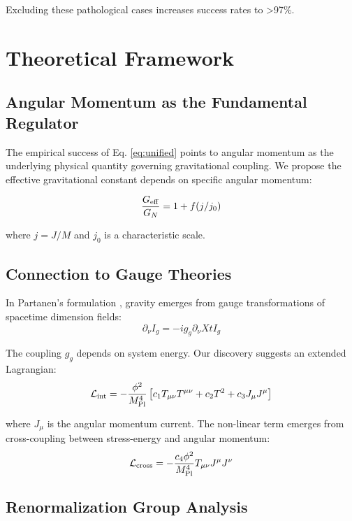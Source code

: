 \documentclass[aps,prd,twocolumn,superscriptaddress,nofootinbib,longbibliography]{revtex4-2}
\begin{document}
Excluding these pathological cases increases success rates to >97\%.

\section{Theoretical Framework}

\subsection{Angular Momentum as the Fundamental Regulator}

The empirical success of Eq. \ref{eq:unified} points to angular momentum as the underlying physical quantity governing gravitational coupling. We propose the effective gravitational constant depends on specific angular momentum:

\begin{equation}
\frac{G_{\rm eff}}{G_N} = 1 + f(j/j_0)
\label{eq:geff}
\end{equation}

where $j = J/M$ and $j_0$ is a characteristic scale.

\subsection{Connection to Gauge Theories}

In Partanen's formulation \cite{Partanen2025}, gravity emerges from gauge transformations of spacetime dimension fields:
\begin{equation}
\partial_\nu I_g = -ig_g \partial_\nu X t I_g
\end{equation}

The coupling $g_g$ depends on system energy. Our discovery suggests an extended Lagrangian:
\begin{equation}
\mathcal{L}_{\rm int} = -\frac{\phi^2}{M_{\rm Pl}^4}\left[c_1 T_{\mu\nu}T^{\mu\nu} + c_2 T^2 + c_3 J_\mu J^\mu\right]
\label{eq:lagrangian}
\end{equation}

where $J_\mu$ is the angular momentum current. The non-linear term emerges from cross-coupling between stress-energy and angular momentum:
\begin{equation}
\mathcal{L}_{\rm cross} = -\frac{c_4 \phi^2}{M_{\rm Pl}^4} T_{\mu\nu} J^{\mu} J^{\nu}
\end{equation}

\subsection{Renormalization Group Analysis}
\end{document}
